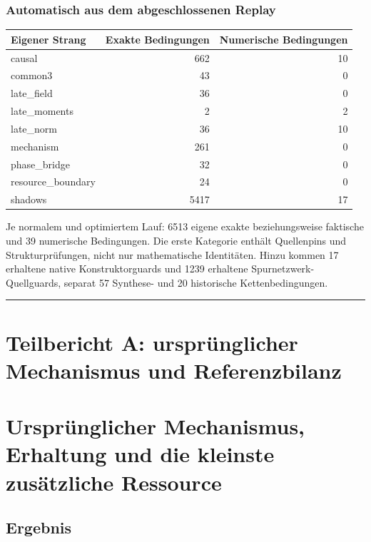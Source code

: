 \subsubsection{Automatisch aus dem abgeschlossenen
Replay}\label{automatisch-aus-dem-abgeschlossenen-replay}

{\def\LTcaptype{none} %
\begin{longtable}[]{@{}lrr@{}}
\toprule\noalign{}
Eigener Strang & Exakte Bedingungen & Numerische Bedingungen \\
\midrule\noalign{}
\endhead
\bottomrule\noalign{}
\endlastfoot
causal & 662 & 10 \\
common3 & 43 & 0 \\
late\_field & 36 & 0 \\
late\_moments & 2 & 2 \\
late\_norm & 36 & 10 \\
mechanism & 261 & 0 \\
phase\_bridge & 32 & 0 \\
resource\_boundary & 24 & 0 \\
shadows & 5417 & 17 \\
\end{longtable}
}

Je normalem und optimiertem Lauf: 6513 eigene exakte beziehungsweise
faktische und 39 numerische Bedingungen. Die erste Kategorie enthält
Quellenpins und Strukturprüfungen, nicht nur mathematische Identitäten.
Hinzu kommen 17 erhaltene native Konstruktorguards und 1239 erhaltene
Spurnetzwerk-Quellguards, separat 57 Synthese- und 20 historische
Kettenbedingungen.

\begin{center}\rule{0.5\linewidth}{0.5pt}\end{center}

\section{Teilbericht A: ursprünglicher Mechanismus und
Referenzbilanz}\label{teilbericht-a-urspruxfcnglicher-mechanismus-und-referenzbilanz}

\section{Ursprünglicher Mechanismus, Erhaltung und die kleinste
zusätzliche
Ressource}\label{urspruxfcnglicher-mechanismus-erhaltung-und-die-kleinste-zusuxe4tzliche-ressource}

\subsection{Ergebnis}\label{ergebnis}

